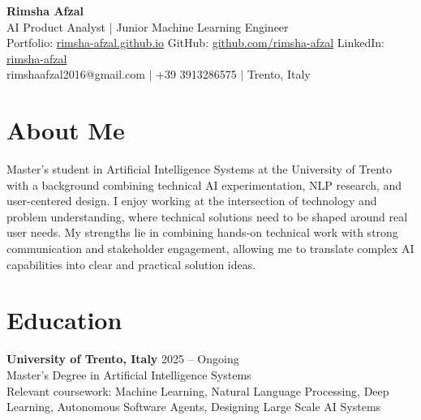 \documentclass[11pt]{article}
\begin{document}

\begin{center}

{\LARGE \textbf{Rimsha Afzal}} \\[6pt]

AI Product Analyst | Junior Machine Learning Engineer \\[6pt]

Portfolio: \href{https://rimsha-afzal.github.io}{rimsha-afzal.github.io} \quad
GitHub: \href{https://github.com/rimsha-afzal}{github.com/rimsha-afzal} \quad
LinkedIn: \href{https://www.linkedin.com/in/rimsha-afzal-b0537123b/?lipi=urn%3Ali%3Apage%3Ad_flagship3_profile_view_base_contact_details%3BTbhXtoP0RS6goeD96Ggzjg%3D%3D}{rimsha-afzal} \\[4pt]
{\color{textgray}rimshaafzal2016@gmail.com $|$ +39 3913286575 $|$ Trento, Italy}

\end{center}

\vspace{-6pt}

\section*{About Me}

Master’s student in Artificial Intelligence Systems at the University of Trento with a background combining technical AI experimentation, NLP research, and user-centered design. I enjoy working at the intersection of technology and problem understanding, where technical solutions need to be shaped around real user needs. My strengths lie in combining hands-on technical work with strong communication and stakeholder engagement, allowing me to translate complex AI capabilities into clear and practical solution ideas.

\section*{Education}

\textbf{University of Trento, Italy} \hfill {\color{textgray}2025 -- Ongoing} \\[-1pt]
Master's Degree in Artificial Intelligence Systems \\[4pt]
{\color{textgray}Relevant coursework: Machine Learning, Natural Language Processing, Deep Learning, Autonomous Software Agents, Designing Large Scale AI Systems}
\end{document}
